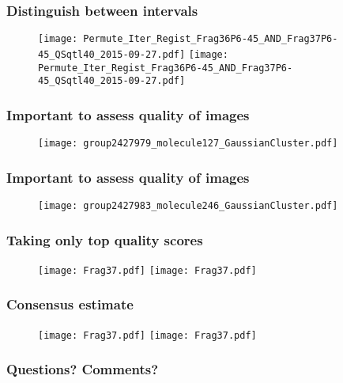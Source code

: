 \documentclass[10pt,dvipsnames,table]{beamer}
\begin{document}
\begin{frame}
\frametitle{Distinguish between intervals}
\begin{figure}
\texttt{[image: Permute\_Iter\_Regist\_Frag36P6-45\_AND\_Frag37P6-45\_QSqtl40\_2015-09-27.pdf]}
\texttt{[image: Permute\_Iter\_Regist\_Frag36P6-45\_AND\_Frag37P6-45\_QSqtl40\_2015-09-27.pdf]}
\end{figure}
\end{frame}

\begin{frame}
\frametitle{Important to assess quality of images}
\begin{figure}
\texttt{[image: group2427979\_molecule127\_GaussianCluster.pdf]}
\end{figure}
\end{frame}

\begin{frame}
\frametitle{Important to assess quality of images}
\begin{figure}
\texttt{[image: group2427983\_molecule246\_GaussianCluster.pdf]}
\end{figure}
\end{frame}

\begin{frame}
\frametitle{Taking only top quality scores}
\begin{figure}
\texttt{[image: Frag37.pdf]}
\texttt{[image: Frag37.pdf]}
\end{figure}
\end{frame}

\begin{frame}
\frametitle{Consensus estimate}
\begin{figure}
\texttt{[image: Frag37.pdf]}
\texttt{[image: Frag37.pdf]}
\end{figure}
\end{frame}

\begin{frame}
\frametitle{Questions? Comments?}

\end{frame}
\end{document}
